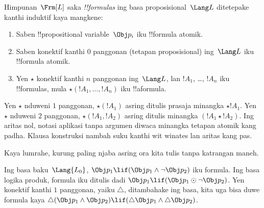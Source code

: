 \documentclass[../../../include/open-logic-section]{subfiles}
\begin{document}


\begin{defn}[Formula]
Himpunan~$\Frm[L]$ saka \emph{!!{formula}s} ing basa
proposisional~$\Lang L$ ditetepake kanthi induktif kaya mangkene:
\begin{enumerate}
\item Saben !!{propositional variable}~$\Obj p_i$ iku
  !!{formula} atomik.
\item Saben konektif kanthi $0$ panggonan (tetapan proposisional)
  ing~$\Lang L$ iku !!{formula} atomik.
\item Yen $\star$ konektif kanthi $n$ panggonan ing~$\Lang L$,
  lan $!A_1$, \dots, $!A_n$ iku !!{formula}s, mula
  $\star(!A_1, \dots, !A_n)$ iku !!a{formula}.
\end{enumerate}
Yen $\star$ nduweni $1$ panggonan, $\star(!A_1)$ asring
ditulis prasaja minangka $\star !A_1$. Yen $\star$ nduweni
$2$ panggonan, $\star(!A_1,!A_2)$ asring ditulis
minangka $(!A_1 \star !A_2)$.
Ing aritas nol, notasi aplikasi tanpa argumen diwaca minangka tetapan atomik kang padha. Klausa konstruksi nambah suku kanthi wit winates lan aritas kang pas.\end{defn}

Kaya lumrahe, kurung paling njaba asring ora kita tulis
tanpa katrangan maneh.

\begin{ex}
  Ing basa baku~$\Lang{L_0}$, $\Obj p_1 \lif (\Obj p_1
  \land \lnot \Obj p_2)$ iku formula. Ing basa logika produk,
  formula iku ditulis dadi $\Obj p_1 \lif (\Obj p_1 \odot
  \lnot \Obj p_2)$. Yen konektif kanthi $1$ panggonan, yaiku
  $\triangle$, ditambahake ing basa, kita uga bisa duwe formula kaya
  $\triangle (\Obj p_1
  \land \Obj p_2) \lif (\triangle \Obj p_1 \land \triangle \Obj p_2)$.
\end{ex}
\end{document}
